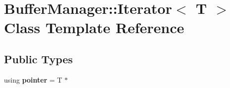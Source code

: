 \hypertarget{class_buffer_manager_1_1_iterator}{}\section{Buffer\+Manager\+::Iterator$<$ T $>$ Class Template Reference}
\label{class_buffer_manager_1_1_iterator}
\subsection*{Public Types}
\begin{DoxyCompactItemize}
\item 
\mbox{\label{class_buffer_manager_1_1_iterator_a16c61a4f27a3ed11fd058bd2aaf30399}} 
using {\bfseries pointer} = T $\ast$
\end{DoxyCompactItemize}
